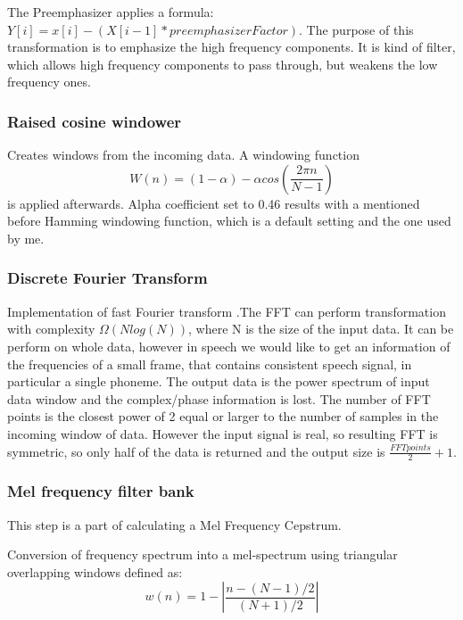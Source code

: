 \documentclass[12pt,a4paper,english]{article}
\begin{document}
The Preemphasizer applies a formula: $Y[i]=x[i]-(X[i-1] * preemphasizerFactor)$.
The purpose of this transformation is to emphasize the high frequency components. It is kind of filter,
which allows high frequency components to pass through, but weakens the low frequency ones.


\newpage
\subsubsection{Raised cosine windower}

Creates windows from the incoming data. A windowing function
\begin{equation}
    W(n)=(1-\alpha) - \alpha cos(\frac{2 \pi n}{N - 1})
\end{equation}
 is applied afterwards. Alpha coefficient set to 0.46 results with a mentioned before Hamming windowing
 function, which is a default setting and the one used by me.

\subsubsection{Discrete Fourier Transform}

Implementation of fast Fourier transform .The FFT can perform transformation with complexity $\Omega(Nlog(N))$,
where N is the size of the input data.
It can be perform on whole data, however in speech we would like to get an information of the frequencies 
of a small frame, that contains consistent speech signal, in particular a single phoneme.
The output data is the power spectrum of input data window and the complex/phase information is lost.
The number of FFT points is the closest power of 2 equal or larger to the number of samples in the incoming window of data. However the input signal is real, so resulting FFT is symmetric, so only half of the data is returned and the output size is $\frac{FFT points}{2} + 1$.

\subsubsection{Mel frequency filter bank}

This step is a part of calculating a Mel Frequency Cepstrum. \newline

Conversion of frequency spectrum into a mel-spectrum using triangular overlapping windows defined as:
\begin{equation}
    w(n) = 1 - |\frac{n - (N - 1)/2}{(N + 1)/2}|
\end{equation}
\end{document}
